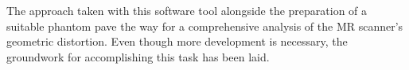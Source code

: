 The approach taken with this software tool alongside the preparation of a suitable phantom pave the way for a comprehensive analysis of the MR scanner's geometric distortion.
Even though more development is necessary, the groundwork for accomplishing this task has been laid.


\let\cleardoublepage\oldcleardoublepage
\newpage
